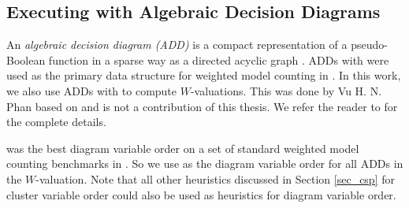 \subsection{Executing with Algebraic Decision Diagrams}
An \emph{algebraic decision diagram (ADD)} is a compact representation of a pseudo-Boolean function in a sparse way as a directed acyclic graph \cite{bahar1997algebraic}.
ADDs with \cudd{} were used as the primary data structure for weighted model counting in  \cite{DPV20,phan2019weighted}.
In this work, we also use ADDs with \cudd{} to compute $W$-valuations.
This was done by Vu H. N. Phan based on  and is not a contribution of this thesis. We refer the reader to \cite{dudek2020dpmc} for the complete details.

\Mcs{} was the best diagram variable order on a set of standard weighted model counting benchmarks in \cite{DPV20}.
So we use \Mcs{} as the diagram variable order for all ADDs in the $W$-valuation.
Note that all other heuristics discussed in Section \ref{sec_csp} for cluster variable order could also be used as heuristics for diagram variable order.

